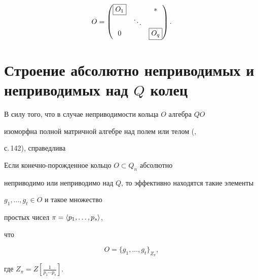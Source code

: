 \begin{equation}


O=


\begin{pmatrix}


\framebox{$O_1$} & & * \\ 


 & \ddots & \\ 


 0 & & \framebox{$O_q$}


\end{pmatrix}


.


\end{equation}





\section{Строение абсолютно неприводимых и неприводимых над $Q$ колец}








В силу того, что в случае неприводимости кольца $O$ алгебра $QO$ 


изоморфна полной матричной алгебре над полем или телом (\cite{Sup},


с.\,142), справедлива 








\begin{thm}


Если конечно-порожденное кольцо $O \subset Q_n$ абсолютно


неприводимо или неприводимо над $Q$, то эффективно находятся такие элементы


$g_1,\dotsc,g_t \in O$ и такое множество 


простых чисел $\pi = \langle p_1,\dotsc,p_s\rangle$,


что


$$


O = \{ g_1,\dotsc,g_t \}_{Z_{\pi}},


$$


где $Z_{\pi} = Z[\frac{1}{p_1 \dotsb p_s}]$.


\end{thm}








